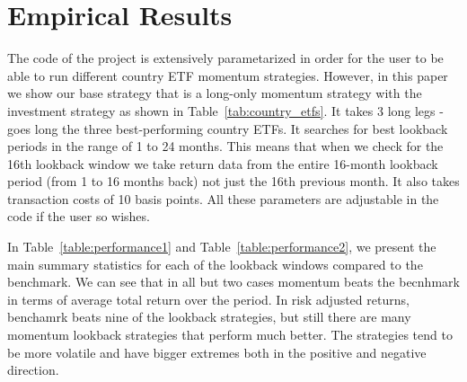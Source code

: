 \documentclass[a4paper,12pt,twoside]{article}
\begin{document}
\newpage
\section{Empirical Results}

The code of the project is extensively parametarized in order for the user to be able to run different country ETF momentum strategies. However, in this paper we show our base strategy that is a long-only momentum strategy with the investment strategy as shown in Table~\ref{tab:country_etfs}. It takes 3 long legs - goes long the three best-performing country ETFs. It searches for best lookback periods in the range of 1 to 24 months. This means that when we check for the 16th lookback window we take return data from the entire 16-month lookback period (from 1 to 16 months back) not just the 16th previous month.  It also takes transaction costs of 10 basis points. All these parameters are adjustable in the code if the user so wishes.

In Table~\ref{table:performance1} and Table~\ref{table:performance2}, we present the main summary statistics for each of the lookback windows compared to the benchmark. We can see that in all but two cases momentum beats the becnhmark in terms of average total return over the period. In risk adjusted returns, benchamrk beats nine of the lookback strategies, but still there are many momentum lookback strategies that perform much better. The strategies tend to be more volatile and have bigger extremes both in the positive and negative direction.
\end{document}
